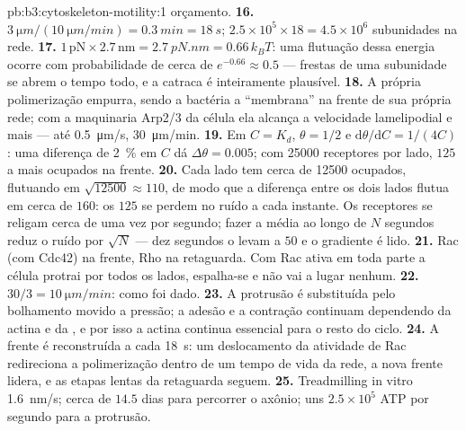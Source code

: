 \begin{solution}{pb:b3:cytoskeleton-motility:1}
orçamento.
\textbf{16.} $\qty{3}{\micro m}/(\qty{10}{\micro m/min}) = \qty{0.3}{min}
= \qty{18}{s}$; $2.5\times 10^{5}\times 18 = 4.5\times 10^{6}$
subunidades na rede.
\textbf{17.} $1\,\text{pN}\times 2.7\,\text{nm} = \qty{2.7}{pN.nm} =
0.66\,k_{B}T$: uma flutuação dessa energia ocorre com probabilidade de
cerca de $e^{-0.66} \approx 0.5$ --- frestas de uma subunidade se abrem
o tempo todo, e a catraca é inteiramente plausível.
\textbf{18.} A própria polimerização empurra, sendo a bactéria a
``membrana'' na frente de sua própria rede; com a maquinaria Arp2/3 da
célula ela alcança a velocidade lamelipodial e mais --- até
\qty{0.5}{\micro m/s}, \qty{30}{\micro m/min}.
\textbf{19.} Em $C = K_{d}$, $\theta = 1/2$ e $\mathrm{d}\theta/
\mathrm{d}C = 1/(4C)$: uma diferença de \qty{2}{\%} em $C$ dá $\Delta\theta
= 0.005$; com \num{25000} receptores por lado, $125$ a mais ocupados na
frente.
\textbf{20.} Cada lado tem cerca de \num{12500} ocupados, flutuando em
$\sqrt{\num{12500}} \approx 110$, de modo que a diferença entre os dois
lados flutua em cerca de $160$: os $125$ se perdem no ruído a cada
instante. Os receptores se religam cerca de uma vez por segundo; fazer
a média ao longo de $N$ segundos reduz o ruído por $\sqrt{N}$ --- dez
segundos o levam a $50$ e o gradiente é lido.
\textbf{21.} Rac (com Cdc42) na frente, Rho na retaguarda. Com Rac
ativa em toda parte a célula protrai por todos os lados, espalha-se e
não vai a lugar nenhum.
\textbf{22.} $30/3 = \qty{10}{\micro m/min}$: como foi dado.
\textbf{23.} A protrusão é substituída pelo bolhamento movido a
pressão; a adesão e a contração continuam dependendo da actina e da
, e por isso a actina continua essencial para o resto do ciclo.
\textbf{24.} A frente é reconstruída a cada \qty{18}{s}: um deslocamento
da atividade de Rac redireciona a polimerização dentro de um tempo de
vida da rede, a nova frente lidera, e as etapas lentas da retaguarda
seguem.
\textbf{25.} Treadmilling in vitro \qty{1.6}{nm/s}; cerca de $14.5$ dias
para percorrer o axônio; uns $2.5\times 10^{5}$ ATP por segundo para a
protrusão.
\end{solution}
